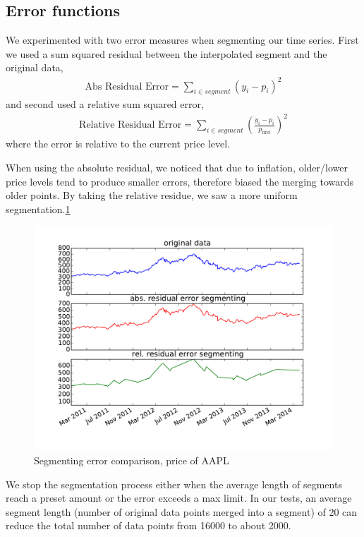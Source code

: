 \documentclass{article} %
\begin{document}
\subsection{Error functions}
We experimented with two error measures when segmenting our time series. First we used a sum squared residual between the interpolated segment and the original data,
\begin{align*}
\text{Abs Residual Error} = \sum_{i\in segment}(y_i-p_i)^2
\end{align*}
and second used a relative sum squared error, 
\begin{align*}
\text{Relative Residual Error} = \sum_{i\in segment}(\frac{y_i-p_i}{p_{\text{first}}})^2
\end{align*}
where the error is relative to the current price level.

When using the absolute residual, we noticed that due to inflation, older/lower price levels tend to produce smaller errors, therefore biased the merging towards older points. By taking the relative residue, we saw a more uniform segmentation.\ref{residuecomp}

\begin{figure}[h]
\begin{center}
\includegraphics[width=1\textwidth]{aapl-residual-error-comparison.pdf}
\end{center}
\caption{Segmenting error comparison, price of AAPL \label{residuecomp}}
\end{figure}

We stop the segmentation process either when the average length of segments reach a preset amount or the error exceeds a max limit. In our tests, an average segment length (number of original data points merged into a segment) of 20 can reduce the total number of data points from 16000 to about 2000. 
\end{document}
